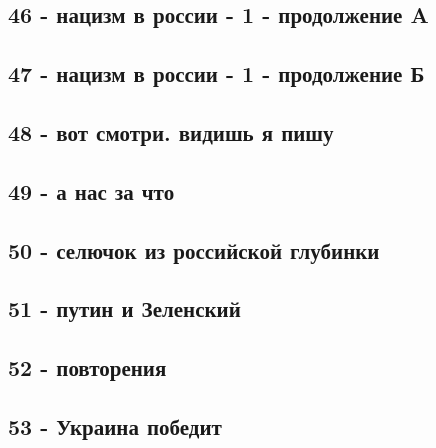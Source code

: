 \subsection{46 - нацизм в россии - 1 - продолжение A}

\subsection{47 - нацизм в россии - 1 - продолжение Б}

\subsection{48 - вот смотри. видишь я пишу}

\subsection{49 - а нас за что}

\subsection{50 - селючок из российской глубинки}

\subsection{51 - путин и Зеленский}

\subsection{52 - повторения}

\subsection{53 - Украина победит}




